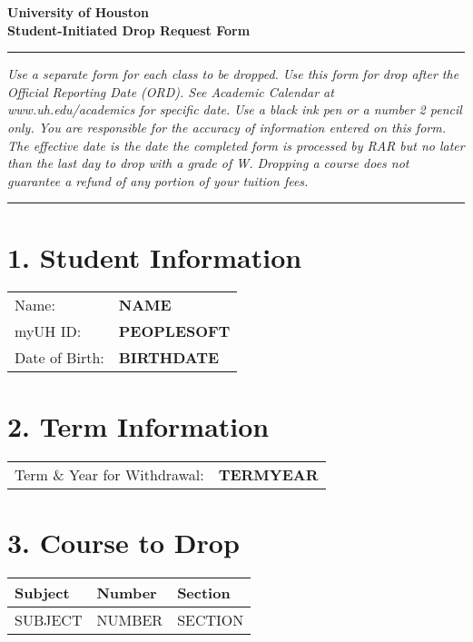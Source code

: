 \documentclass[12pt]{article}
\begin{document}
\begin{center}
  \textbf{\Large University of Houston}\\[0.2cm]
  \textbf{\large Student-Initiated Drop Request Form}\\[0.2cm]
\end{center}

\hrule
\vspace{0.5cm}

\noindent\textit{Use a separate form for each class to be dropped. Use this form for drop after the Official Reporting Date (ORD). See Academic Calendar at www.uh.edu/academics for specific date.}
\noindent\textit{Use a black ink pen or a number 2 pencil only. You are responsible for the accuracy of information entered on this form. The effective date is the date the completed form is processed by RAR but no later than the last day to drop with a grade of W. Dropping a course does not guarantee a refund of any portion of your tuition fees.}
\vspace{0.5cm}
\hrule
\vspace{0.5cm}

\section*{1. Student Information}
\begin{tabular}{ll}
Name: & \textbf{ {{NAME}} } \\
myUH ID: & \textbf{ {{PEOPLESOFT}} } \\
Date of Birth: & \textbf{ {{BIRTHDATE} }}
\end{tabular}

\section*{2. Term Information}
\begin{tabular}{ll}
Term \& Year for Withdrawal: & \textbf{ {{TERMYEAR}} } \\
\end{tabular}

\section*{3. Course to Drop}
\begin{tabular}{lll}
\textbf{Subject} & \textbf{Number} & \textbf{Section} \\
\hline
{{SUBJECT}} & {{NUMBER}} & {{SECTION}} \\
\end{tabular}
\end{document}
